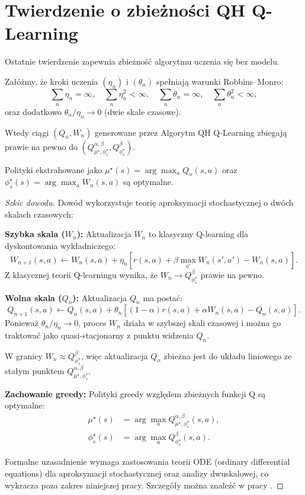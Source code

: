\section{Twierdzenie o zbieżności QH Q-Learning}

Ostatnie twierdzenie zapewnia zbieżność algorytmu uczenia się bez modelu.

\begin{theorem}
\label{thm:qh-qlearning-conv}
Załóżmy, że kroki uczenia $(\eta_n)$ i $(\theta_n)$ spełniają warunki Robbins--Monro:
\[
\sum_n \eta_n = \infty, \quad \sum_n \eta_n^2 < \infty, \quad \sum_n \theta_n = \infty, \quad \sum_n \theta_n^2 < \infty,
\]
oraz dodatkowo $\theta_n / \eta_n \to 0$ (dwie skale czasowe). 

Wtedy ciągi $(Q_n, W_n)$ generowane przez Algorytm QH Q-Learning zbiegają prawie na pewno do $(Q^{\alpha, \beta}_{\mu^\star, \phi_s^\star}, Q^{\beta}_{\phi_s^\star})$. 

Polityki ekstrahowane jako $\mu^\star(s) = \arg\max_a Q_n(s,a)$ oraz $\phi_s^\star(s) = \arg\max_a W_n(s,a)$ są optymalne.
\end{theorem}

\begin{proof}[Szkic dowodu]
Dowód wykorzystuje teorię aproksymacji stochastycznej o dwóch skalach czasowych:

\textbf{Szybka skala ($W_n$):} 
Aktualizacja $W_n$ to klasyczny Q-learning dla dyskontowania wykładniczego:
\[
W_{n+1}(s, a) \leftarrow W_n(s, a) + \eta_n \left[ r(s, a) + \beta \max_{a'} W_n(s', a') - W_n(s, a) \right].
\]
Z klasycznej teorii Q-learningu wynika, że $W_n \to Q^{\beta}_{\phi_s^\star}$ prawie na pewno.

\textbf{Wolna skala ($Q_n$):}
Aktualizacja $Q_n$ ma postać:
\[
Q_{n+1}(s, a) \leftarrow Q_n(s, a) + \theta_n \left[ (1 - \alpha) r(s, a) + \alpha W_n(s, a) - Q_n(s, a) \right].
\]
Ponieważ $\theta_n / \eta_n \to 0$, proces $W_n$ działa w szybszej skali czasowej i można go traktować jako quasi-stacjonarny z punktu widzenia $Q_n$.

W granicy $W_n \approx Q^{\beta}_{\phi_s^\star}$, więc aktualizacja $Q_n$ zbieżna jest do układu liniowego ze stałym punktem $Q^{\alpha, \beta}_{\mu^\star, \phi_s^\star}$.

\textbf{Zachowanie greedy:}
Polityki greedy względem zbieżnych funkcji Q są optymalne:
\begin{align}
\mu^\star(s) &= \arg\max_a Q^{\alpha, \beta}_{\mu^\star, \phi_s^\star}(s,a), \\
\phi_s^\star(s) &= \arg\max_a Q^{\beta}_{\phi_s^\star}(s,a).
\end{align}

Formalne uzasadnienie wymaga zastosowania teorii ODE (ordinary differential equations) dla aproksymacji stochastycznej oraz analizy dwuskalowej, co wykracza poza zakres niniejszej pracy. Szczegóły można znaleźć w pracy \cite{eshwar2024}.
\end{proof}

